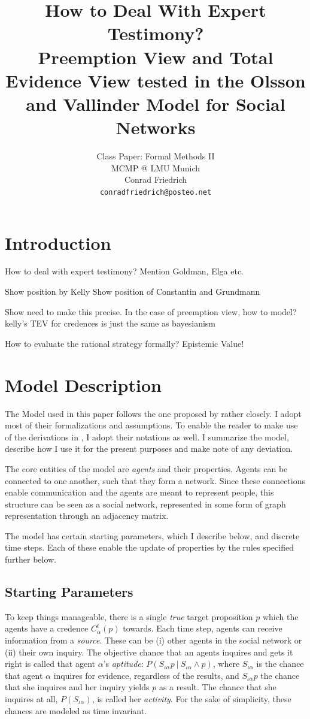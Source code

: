 \documentclass[11pt, a4paper]{article}
\title{\textbf{How to Deal With Expert Testimony?} \\Preemption View and Total Evidence View tested in the Olsson and Vallinder Model for Social Networks }
\author{Class Paper: Formal Methods II \\ MCMP @ LMU Munich \\ Conrad Friedrich \\ \texttt{conradfriedrich@posteo.net}}
\newcommand{\given}[1][]{\:#1\vert\:}
\renewcommand{\i}[1]{\emph{#1}}
\begin{document}
\maketitle
\abstract{}
\section{Introduction}
How to deal with expert testimony? Mention Goldman, Elga etc.

Show position by Kelly
Show position of Constantin and Grundmann

Show need to make this precise. In the case of preemption view, how to model? 
kelly's TEV for credences is just the same as bayesianism 

How to evaluate the rational strategy formally?
Epistemic Value!

\section{Model Description}

The Model used in this paper follows the one proposed by \textcite{Olsson2013} rather closely. I adopt most of their formalizations and assumptions. To enable the reader to make use of the derivations in \textcite{Angere2010}, I adopt their notations as well. I summarize the model, describe how I use it for the present purposes and make note of any deviation.

The core entities of the model are \i{agents} and their properties. Agents can be connected to one another, such that they form a network. Since these connections enable communication and the agents are meant to represent people, this structure can be seen as a social network, represented in some form of graph representation through an adjacency matrix.

The model has certain starting parameters, which I describe below, and discrete time steps. Each of these enable the update of properties by the rules specified further below.

\subsection{Starting Parameters}

To keep things manageable, there is a single \i{true} target proposition $p$ which the agents have a credence $C^t_\alpha(p)$ towards. Each time step, agents can receive information from a \i{source}. These can be (i) other agents in the social network or (ii) their own inquiry. The objective chance that an agents inquires and gets it right is called that agent $\alpha$'s \i{aptitude}: $P(S_{\iota \alpha}p \given S_{\iota \alpha} \land p)$, where $S_{\iota \alpha}$ is the chance that agent $\alpha$ inquires for evidence, regardless of the results, and $S_{\iota \alpha} p$ the chance that she inquires and her inquiry yields $p$ as a result. The chance that she inquires at all, $P(S_{\iota \alpha})$, is called her \i{activity}. For the sake of simplicity, these chances are modeled as time invariant.
\end{document}
